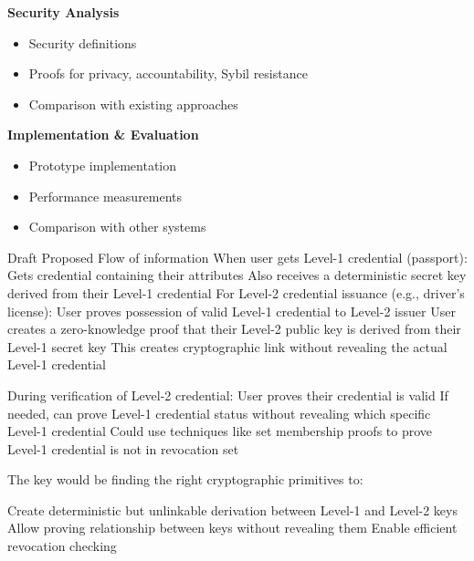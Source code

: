 

\noindent \textbf{Security Analysis}
\begin{itemize}
    \item Security definitions
    \item Proofs for privacy, accountability, Sybil resistance
    \item Comparison with existing approaches
\end{itemize}


\noindent \textbf{Implementation \& Evaluation}
\begin{itemize}
    \item Prototype implementation
    \item Performance measurements
    \item Comparison with other systems
\end{itemize}


Draft Proposed Flow of information
When user gets Level-1 credential (passport):
Gets credential containing their attributes
Also receives a deterministic secret key derived from their Level-1 credential
For Level-2 credential issuance (e.g., driver's license):
User proves possession of valid Level-1 credential to Level-2 issuer
User creates a zero-knowledge proof that their Level-2 public key is derived from their Level-1 secret key
This creates cryptographic link without revealing the actual Level-1 credential


During verification of Level-2 credential:
User proves their credential is valid
If needed, can prove Level-1 credential status without revealing which specific Level-1 credential
Could use techniques like set membership proofs to prove Level-1 credential is not in revocation set

The key would be finding the right cryptographic primitives to:

Create deterministic but unlinkable derivation between Level-1 and Level-2 keys
Allow proving relationship between keys without revealing them
Enable efficient revocation checking


